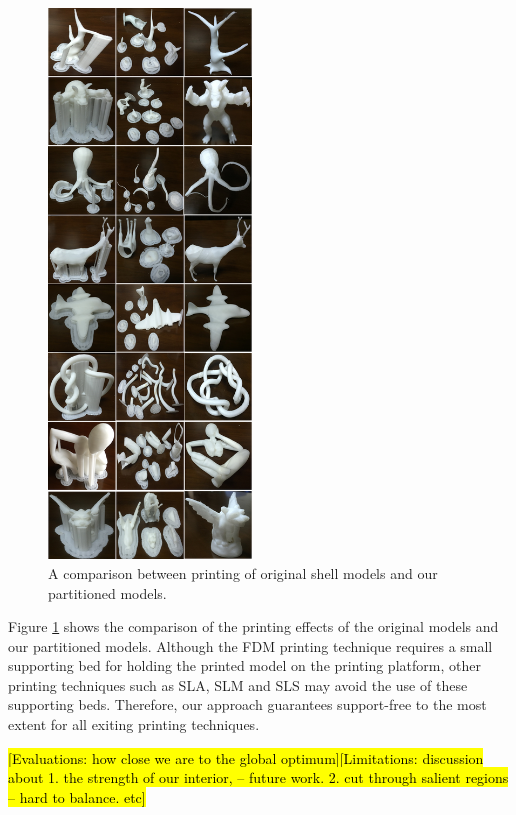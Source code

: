 \begin{figure}[tbp]
  \centering
  \includegraphics[width=0.48\textwidth]{figs/experiment.png}
  \caption{\label{fig:experiment}%
           A comparison between printing of original shell models and our partitioned models.}
\end{figure}


 Figure \ref{fig:experiment} shows the comparison of the printing effects of the original models and our partitioned models. Although the FDM printing technique requires a small supporting bed for holding the printed model on the printing platform, other printing techniques such as SLA, SLM and SLS may avoid the use of these supporting beds. Therefore, our approach guarantees support-free to the most extent for all exiting printing techniques.

\hl {[Evaluations: how close we are to the global optimum][Limitations: discussion about 1. the strength of our interior, -- future work. 2. cut through salient regions -- hard to balance. etc]}


